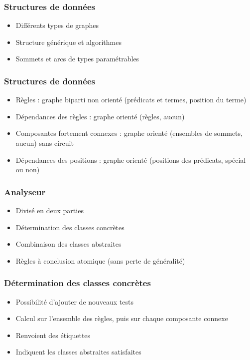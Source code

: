 
\begin{frame}
	\frametitle{Structures de données}
	\begin{itemize}
		\item Différents types de graphes
		\item Structure générique et algorithmes
		\item Sommets et arcs de types paramétrables
	\end{itemize}
\end{frame}

\begin{frame}
	\frametitle{Structures de données}
	\begin{itemize}
		\item Règles : graphe biparti non orienté (prédicats et termes, position du terme)
		\item Dépendances des règles : graphe orienté (règles, aucun)
		\item Composantes fortement connexes : graphe orienté (ensembles de sommets,
		aucun) sans circuit
		\item Dépendances des positions : graphe orienté (positions des prédicats,
		spécial ou non)
	\end{itemize}
\end{frame}

\begin{frame}
	\frametitle{Analyseur}
	\begin{itemize}
		\item Divisé en deux parties
		\item Détermination des classes concrètes
		\item Combinaison des classes abstraites
		\item Règles à conclusion atomique (sans perte de généralité)
	\end{itemize}
\end{frame}

\begin{frame}
	\frametitle{Détermination des classes concrètes}
	\begin{itemize}
		\item Possibilité d'ajouter de nouveaux tests
		\item Calcul sur l'ensemble des règles, puis sur chaque composante connexe
		\item Renvoient des étiquettes
		\item Indiquent les classes abstraites satisfaites
	\end{itemize}
\end{frame}

